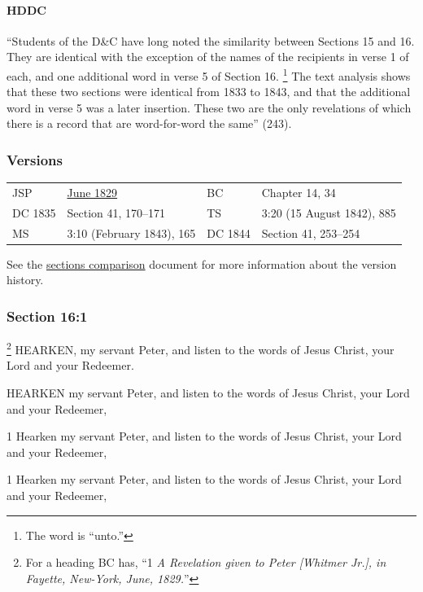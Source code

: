 		\paragraph{HDDC}
		
			``Students of the D\&C have long noted the similarity between Sections 15 and 16. They are identical with the exception of the names of the recipients in verse 1 of each, and one additional word in verse 5 of Section 16.%
				\footnote{%
					The word is ``unto.''
					}
			The text analysis shows that these two sections were identical from 1833 to 1843, and that the additional word in verse 5 was a later insertion. These two are the only revelations of which there is a record that are word-for-word the same'' (243).
			
	\subsubsection{Versions}
		\label{DC16-V}
	
		\begin{tabular}{p{1in}p{2in}p{1in}p{2in}}
			JSP		& \hyperref[EMS-1828-1829-JS-JUN-1829-D]{June 1829}	& BC & Chapter 14, 34 \\
			DC 1835	& Section 41, 170--171								& TS & 3:20 (15 August 1842), 885 \\
			MS 		& 3:10 (February 1843), 165 						& DC 1844 & Section 41, 253--254 \\
		\end{tabular}
		
		\medskip
		
		See the \href{https://drive.google.com/file/d/1goAvNz8jS4R8slYfMG_db55Ty2z_vmgK/view?usp=sharing}{sections comparison} document for more information about the version history.

	\subsubsection{Section 16:1} %
		\label{DC16-1}

			\footnote{%
				For a heading BC has, ``1 \textit{A Revelation given to Peter [Whitmer Jr.], in Fayette, New-York, June, 1829.}''
				}%
		HEARKEN, my servant Peter, and listen to the words of Jesus Christ, your Lord and your Redeemer.

		\begin{framed}
		\scriptsize
			\begin{compactdesc}
				\item[JSP] HEARKEN my servant Peter, and listen to the words of Jesus Christ, your Lord and your Redeemer, 
				\item[DC 1835] 1 Hearken my servant Peter, and listen to the words of Jesus Christ, your Lord and your Redeemer, 
				\item[DC 1844] 1 Hearken my servant Peter, and listen to the words of Jesus Christ, your Lord and your Redeemer, 
			\end{compactdesc}
		\end{framed}


